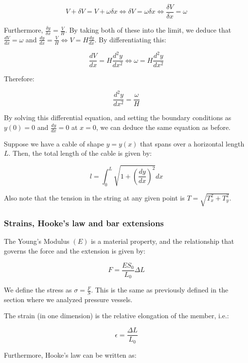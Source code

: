 \documentclass{article}
\begin{document}
\[ V + \delta V = V + \omega \delta x \iff \delta V = \omega\delta x \iff \frac{\delta V}{\delta x} = \omega \]

Furthermore, $\frac{\delta y}{\delta x} = \frac{V}{H}$. By taking both of these into the limit, we deduce that $\frac{dV}{dx} = \omega$ and $\frac{dy}{dx} = \frac{V}{H} \iff V = H\frac{dy}{dx}$. By differentiating this:

\[ \frac{dV}{dx} = H\frac{d^2y}{dx^2} \iff \omega = H\frac{d^2y}{dx^2} \]

Therefore:

\[ \frac{d^2y}{dx^2} = \frac{\omega}{H} \]

By solving this differential equation, and setting the boundary conditions as $y(0) = 0$ and $\frac{dy}{dx} = 0$ at $x = 0$, we can deduce the same equation as before. 

\begin{proposition}
    Suppose we have a cable of shape $y = y(x)$ that spans over a horizontal length $L$. Then, the total length of the cable is given by:

    \[ l = \int_0^L \sqrt{1 + \left(\frac{dy}{dx}\right)^2}dx \]
\end{proposition}

Also note that the tension in the string at any given point is $T = \sqrt{T_x^2 + T_y^2}$.

\subsubsection{Strains, Hooke's law and bar extensions}

The Young's Modulus $(E)$ is a material property, and the relationship that governs the force and the extension is given by:

\[ F = \frac{ES_0}{L_0}\Delta L \]

\begin{definition}[Stress]
    We define the stress as $\sigma = \frac{F}{S}$. This is the same as previously defined in the section where we analyzed pressure vessels.
\end{definition}

\begin{definition}[Strain]
    The strain (in one dimension) is the relative elongation of the member, i.e.:

    \[ \epsilon = \frac{\Delta L}{L_0} \]
\end{definition}

Furthermore, Hooke's law  can be written as:
\end{document}
